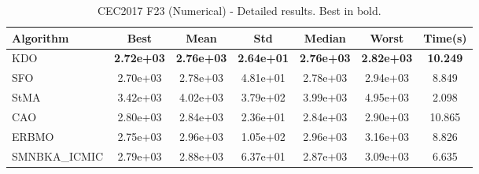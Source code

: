 \begin{table}[H]
\centering\small
\caption{CEC2017 F23 (Numerical) - Detailed results. Best in bold.}
\label{tab:cec2017_F23}
\begin{tabular}{lcccccc}
\toprule
\textbf{Algorithm} & \textbf{Best} & \textbf{Mean} & \textbf{Std} & \textbf{Median} & \textbf{Worst} & \textbf{Time(s)} \\
\midrule
KDO & \textbf{2.72e+03} & \textbf{2.76e+03} & \textbf{2.64e+01} & \textbf{2.76e+03} & \textbf{2.82e+03} & \textbf{10.249} \\
SFO & 2.70e+03 & 2.78e+03 & 4.81e+01 & 2.78e+03 & 2.94e+03 & 8.849 \\
StMA & 3.42e+03 & 4.02e+03 & 3.79e+02 & 3.99e+03 & 4.95e+03 & 2.098 \\
CAO & 2.80e+03 & 2.84e+03 & 2.36e+01 & 2.84e+03 & 2.90e+03 & 10.865 \\
ERBMO & 2.75e+03 & 2.96e+03 & 1.05e+02 & 2.96e+03 & 3.16e+03 & 8.826 \\
SMNBKA_ICMIC & 2.79e+03 & 2.88e+03 & 6.37e+01 & 2.87e+03 & 3.09e+03 & 6.635 \\
\bottomrule
\end{tabular}
\end{table}
